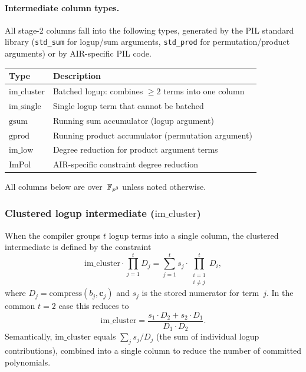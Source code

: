 \paragraph{Intermediate column types.}
All stage-2 columns fall into the following types,
generated by the PIL standard library
(\texttt{std\_sum} for logup/sum arguments,
\texttt{std\_prod} for permutation/product arguments)
or by AIR-specific PIL code.

\begin{center}
\renewcommand{\arraystretch}{1.3}
\begin{tabular}{@{}lp{}@{}}
  \toprule
  Type & Description \\
  \midrule
  $\mathrm{im\_cluster}$ & Batched logup: combines $\geq 2$ terms into one column \\
  $\mathrm{im\_single}$ & Single logup term that cannot be batched \\
  $\mathrm{gsum}$ & Running sum accumulator (logup argument) \\
  $\mathrm{gprod}$ & Running product accumulator (permutation argument) \\
  $\mathrm{im\_low}$ & Degree reduction for product argument terms \\
  $\mathrm{ImPol}$ & AIR-specific constraint degree reduction \\
  \bottomrule
\end{tabular}
\end{center}

All columns below are over~$\mathbb{F}_{p^3}$ unless noted otherwise.

\subsubsection*{Clustered logup intermediate ($\mathrm{im\_cluster}$)}

When the compiler groups $t$ logup terms into a single column,
the clustered intermediate is defined by the constraint
\[
  \mathrm{im\_cluster} \cdot \prod_{j=1}^{t} D_j
  = \sum_{j=1}^{t} s_j \cdot \prod_{\substack{i=1 \\ i \neq j}}^{t} D_i,
\]
where $D_j = \mathrm{compress}(b_j, \mathbf{c}_j)$ and $s_j$ is the stored
numerator for term~$j$.
In the common $t = 2$ case this reduces to
\[
  \mathrm{im\_cluster} = \frac{s_1 \cdot D_2 + s_2 \cdot D_1}{D_1 \cdot D_2}.
\]
Semantically, $\mathrm{im\_cluster}$ equals
$\sum_j s_j / D_j$ (the sum of individual logup contributions),
combined into a single column to reduce the number of committed polynomials.

